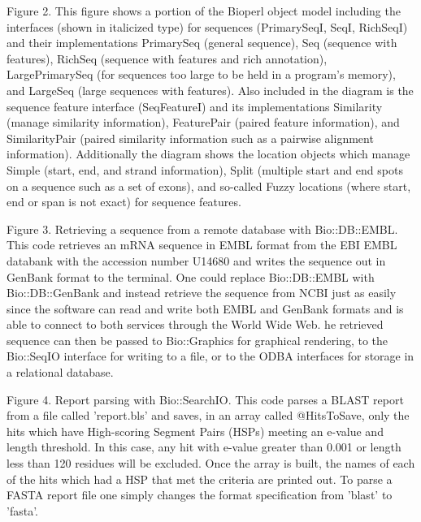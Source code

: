 \documentclass[12pt]{article}
\begin{document}
\newpage


Figure 2. This figure shows a portion of the Bioperl object model
including the interfaces (shown in italicized type) for sequences
(PrimarySeqI, SeqI, RichSeqI) and their implementations PrimarySeq
(general sequence), Seq (sequence with features), RichSeq (sequence
with features and rich annotation), LargePrimarySeq (for sequences too
large to be held in a program's memory), and LargeSeq (large sequences
with features).  Also included in the diagram is the sequence feature
interface (SeqFeatureI) and its implementations Similarity (manage
similarity information), FeaturePair (paired feature information), and
SimilarityPair (paired similarity information such as a pairwise
alignment information).  Additionally the diagram shows the location
objects which manage Simple (start, end, and strand information),
Split (multiple start and end spots on a sequence such as a set of
exons), and so-called Fuzzy locations (where start, end or span is not
exact) for sequence features.

\newpage


Figure 3. Retrieving a sequence from a remote database with
Bio::DB::EMBL.  This code retrieves an mRNA sequence in EMBL format
from the EBI EMBL databank with the accession number U14680 and writes
the sequence out in GenBank format to the terminal.  One could replace
Bio::DB::EMBL with Bio::DB::GenBank and instead retrieve the sequence
from NCBI just as easily since the software can read and write both
EMBL and GenBank formats and is able to connect to both services
through the World Wide Web.  he retrieved sequence can then be passed
to Bio::Graphics for graphical rendering, to the Bio::SeqIO interface
for writing to a file, or to the ODBA interfaces for storage in a
relational database.

\newpage


Figure 4. Report parsing with Bio::SearchIO.  This code parses a BLAST
report from a file called 'report.bls' and saves, in an array called
@HitsToSave, only the hits which have High-scoring Segment Pairs (HSPs)
meeting an e-value and length threshold.  In this case, any hit with
e-value greater than 0.001 or length less than 120 residues will be
excluded.  Once the array is built, the names of each of the hits
which had a HSP that met the criteria are printed out.  To parse a
FASTA \cite{fasta} report file one simply changes the format
specification from 'blast' to 'fasta'.
\end{document}
